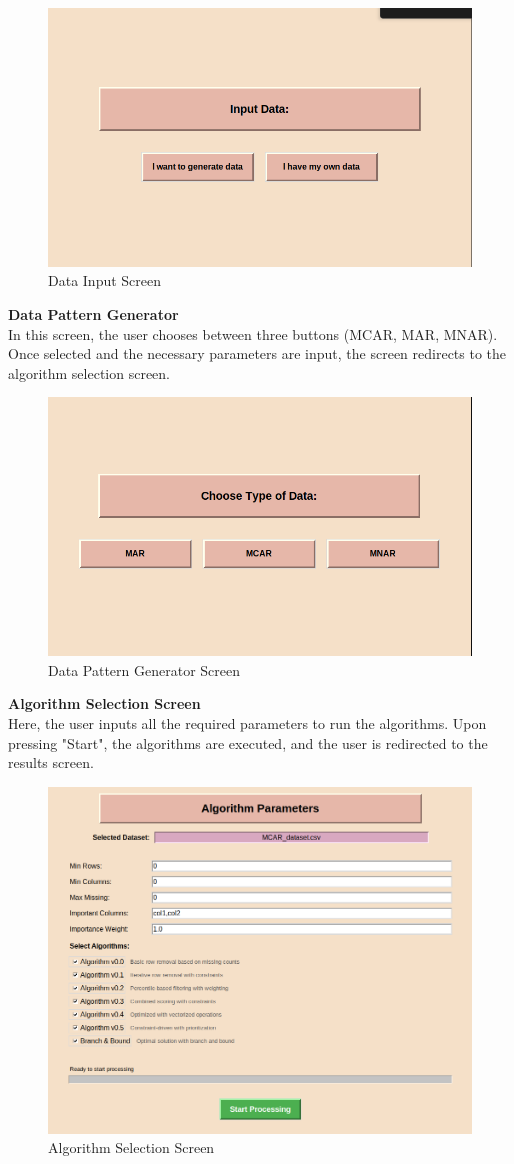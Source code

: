 \documentclass[a4paper,12pt]{article}
\begin{document}
\begin{figure}[H]
\centering
\includegraphics[width=0.5\linewidth]{Data_input.png}
\caption{Data Input Screen}
\end{figure}

\textbf{Data Pattern Generator} \\
In this screen, the user chooses between three buttons (MCAR, MAR, MNAR). Once selected and the necessary parameters are input, the screen redirects to the algorithm selection screen.

\begin{figure}[H]
\centering
\includegraphics[width=0.5\linewidth]{MCAR_MNAR_MAR.png}
\caption{Data Pattern Generator Screen}
\end{figure}

\textbf{Algorithm Selection Screen} \\
Here, the user inputs all the required parameters to run the algorithms. Upon pressing "Start", the algorithms are executed, and the user is redirected to the results screen.

\begin{figure}[H]
\centering
\includegraphics[width=0.5\linewidth]{ALG_INP.png}
\caption{Algorithm Selection Screen}
\end{figure}
\end{document}

